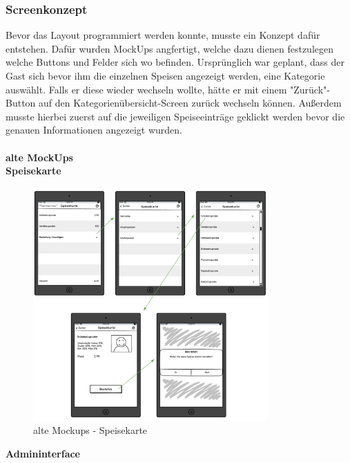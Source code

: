     \subsubsection{Screenkonzept}
Bevor das Layout programmiert werden konnte, musste ein Konzept dafür entstehen. Dafür wurden MockUps angfertigt, welche dazu dienen festzulegen welche Buttons und Felder sich wo befinden.
Ursprünglich war geplant, dass der Gast sich bevor ihm die einzelnen Speisen angezeigt werden, eine Kategorie auswählt. Falls er diese wieder wechseln wollte, hätte er mit einem "Zurück"-Button auf den Kategorienübersicht-Screen zurück wechseln können. Außerdem musste hierbei zuerst auf die jeweiligen Speiseeinträge geklickt werden bevor die genauen Informationen angezeigt wurden.
\\ \\
\textbf{alte MockUps}\\
\textbf{Speisekarte}\\
			\begin{figure}[H]
			\begin{centering}
			\includegraphics[width = 0.8\textwidth]{Bilder/Jok_alte_mockups}
			\par\end{centering}
			\caption{alte Mockups - Speisekarte}
			\label{alte Mockups - Speisekarte}
			\end{figure}\textbf{Admininterface}\\
